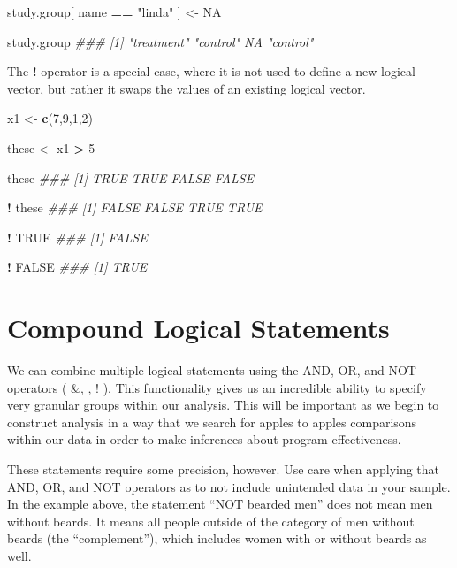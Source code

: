 \documentclass[]{book}
\newenvironment{Shaded}{\begin{snugshade}}{\end{snugshade}}
\newcommand{\CommentTok}[1]{\textcolor[rgb]{0.56,0.35,0.01}{\textit{#1}}}
\newcommand{\DecValTok}[1]{\textcolor[rgb]{0.00,0.00,0.81}{#1}}
\newcommand{\KeywordTok}[1]{\textcolor[rgb]{0.13,0.29,0.53}{\textbf{#1}}}
\newcommand{\NormalTok}[1]{#1}
\newcommand{\OperatorTok}[1]{\textcolor[rgb]{0.81,0.36,0.00}{\textbf{#1}}}
\newcommand{\OtherTok}[1]{\textcolor[rgb]{0.56,0.35,0.01}{#1}}
\newcommand{\StringTok}[1]{\textcolor[rgb]{0.31,0.60,0.02}{#1}}
\theoremstyle{definition}
\theoremstyle{definition}
\theoremstyle{definition}
\theoremstyle{remark}
\begin{document}
\begin{Shaded}
\begin{Highlighting}[]
\NormalTok{study.group[ name }\OperatorTok{==}\StringTok{ "linda"}\NormalTok{ ] <-}\StringTok{ }\OtherTok{NA}

\NormalTok{study.group}
\CommentTok{### [1] "treatment" "control"   NA          "control"}
\end{Highlighting}
\end{Shaded}

The \textbf{!} operator is a special case, where it is not used to
define a new logical vector, but rather it swaps the values of an
existing logical vector.

\begin{Shaded}
\begin{Highlighting}[]
\NormalTok{x1 <-}\StringTok{ }\KeywordTok{c}\NormalTok{(}\DecValTok{7}\NormalTok{,}\DecValTok{9}\NormalTok{,}\DecValTok{1}\NormalTok{,}\DecValTok{2}\NormalTok{)}

\NormalTok{these <-}\StringTok{ }\NormalTok{x1 }\OperatorTok{>}\StringTok{ }\DecValTok{5}

\NormalTok{these}
\CommentTok{### [1]  TRUE  TRUE FALSE FALSE}

\OperatorTok{!}\StringTok{ }\NormalTok{these}
\CommentTok{### [1] FALSE FALSE  TRUE  TRUE}

\OperatorTok{!}\StringTok{ }\OtherTok{TRUE}
\CommentTok{### [1] FALSE}

\OperatorTok{!}\StringTok{ }\OtherTok{FALSE}
\CommentTok{### [1] TRUE}
\end{Highlighting}
\end{Shaded}

\hypertarget{compound-logical-statements}{%
\section{Compound Logical
Statements}\label{compound-logical-statements}}

We can combine multiple logical statements using the AND, OR, and NOT
operators ( \&, \textbar{}, ! ). This functionality gives us an
incredible ability to specify very granular groups within our analysis.
This will be important as we begin to construct analysis in a way that
we search for apples to apples comparisons within our data in order to
make inferences about program effectiveness.

These statements require some precision, however. Use care when applying
that AND, OR, and NOT operators as to not include unintended data in
your sample. In the example above, the statement ``NOT bearded men''
does not mean men without beards. It means all people outside of the
category of men without beards (the ``complement''), which includes
women with or without beards as well.
\end{document}
